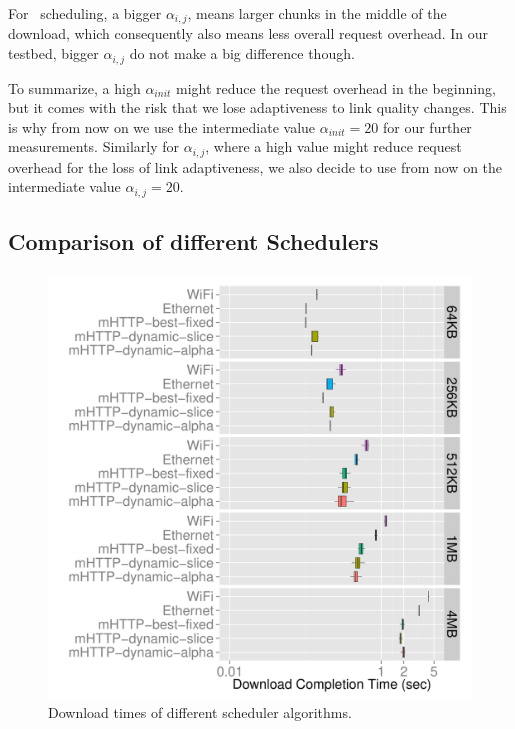 For \algslice~scheduling, a bigger $\alpha_{i,j}$, means larger chunks in the middle of the download, which consequently also means less overall request overhead. 
In our testbed, bigger $\alpha_{i,j}$ do not make a big difference though. 

To summarize, a high $\alpha_{init}$ might reduce the request overhead in the beginning, but it comes with the risk that we lose adaptiveness to link quality changes. 
This is why from now on we use the intermediate value $\alpha_{init} = 20$ for our further measurements. 
Similarly for $\alpha_{i,j}$, where a high value might reduce request overhead for the loss of link adaptiveness, we also decide to use from now on the intermediate value $\alpha_{i,j} = 20$. 

\pagebreak
\subsection{Comparison of different Schedulers} 
\label{sec:evaluation-schedulers-mixed}

\begin{figure}[!htb]
    \begin{minipage}[t]{0.8\linewidth}
	\begin{center}
        \includegraphics[width=\linewidth]{Figures/scheduler-comparison.pdf}
		\caption{\label{fig:evaluation-comparison-times}Download times of different scheduler algorithms.}
    \end{center}
    \end{minipage}
\vspace*{-0.3cm}
\end{figure}

